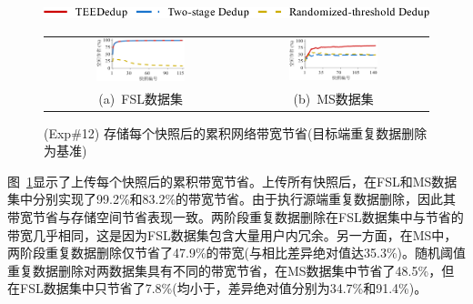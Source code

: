 \begin{figure}[!htb]
  \centering
  \includegraphics[height=11pt]{pic/sgxdedup/plot/upload_traffic/upload_traffic_legend.pdf}
  \begin{tabular}{@{\ }c@{\ }c}
    \includegraphics[width=0.49\textwidth]{pic/sgxdedup/plot/upload_traffic/upload_traffic_fsl.pdf} & 
    \includegraphics[width=0.49\textwidth]{pic/sgxdedup/plot/upload_traffic/upload_traffic_ms.pdf}     \\ 
    \mbox{\small (a) FSL数据集}                                                                     & 
    \mbox{\small (b) MS数据集}
  \end{tabular}
  \caption{(Exp\#12) 存储每个快照后的累积网络带宽节省(目标端重复数据删除为基准)}
  \label{fig:sgxdedup-uploadTraffic}
\end{figure}

图~\ref{fig:sgxdedup-uploadTraffic}显示了上传每个快照后的累积带宽节省。上传所有快照后，\sysnameS 在FSL和MS数据集中分别实现了99.2\%和83.2\%的带宽节省。由于\sysnameS 执行源端重复数据删除，因此其带宽节省与存储空间节省表现一致。两阶段重复数据删除在FSL数据集中与\sysnameS 节省的带宽几乎相同，这是因为FSL数据集包含大量用户内冗余。另一方面，在MS中，两阶段重复数据删除仅节省了47.9\%的带宽(与\sysnameS 相比差异绝对值达35.3\%)。随机阈值重复数据删除对两数据集具有不同的带宽节省，在MS数据集中节省了48.5\%，但在FSL数据集中只节省了7.8\%(均小于\sysnameS，差异绝对值分别为34.7\%和91.4\%)。


